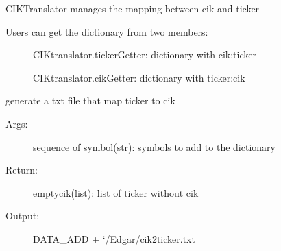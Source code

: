 \documentclass[letterpaper,10pt,english]{sphinxmanual}
\begin{document}
\begin{fulllineitems}
\label{utils:form10DB.CIKTranslator}
CIKTranslator manages the mapping between cik and ticker
\begin{description}
\item[{Users can get the dictionary from two members:}] \leavevmode
CIKtranslator.tickerGetter:   dictionary with cik:ticker

CIKtranslator.cikGetter:      dictionary with ticker:cik

\end{description}

\begin{fulllineitems}
\label{utils:form10DB.CIKTranslator.updateCIKtable}
generate a txt file that map ticker to cik
\begin{description}
\item[{Args:}] \leavevmode
sequence of symbol(str): symbols to add to the dictionary

\item[{Return:}] \leavevmode
emptycik(list): list of ticker without cik

\item[{Output:}] \leavevmode
DATA\_ADD + `/Edgar/cik2ticker.txt

\end{description}

\end{fulllineitems}


\end{fulllineitems}

\end{document}
